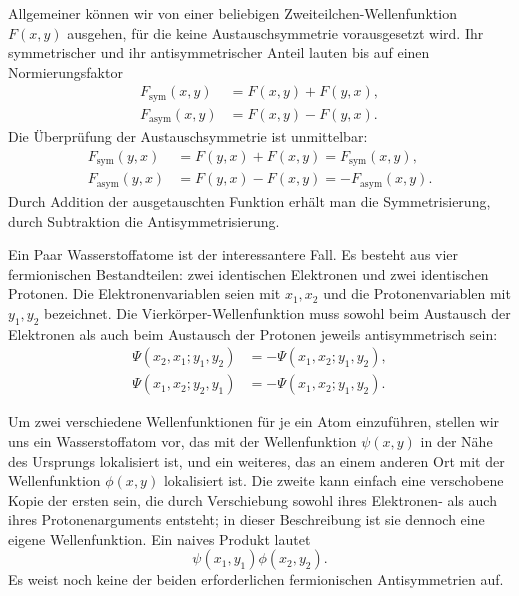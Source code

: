 Allgemeiner können wir von einer beliebigen Zweiteilchen-Wellenfunktion \(F(x,y)\) ausgehen, für die keine Austauschsymmetrie vorausgesetzt wird. Ihr symmetrischer und ihr antisymmetrischer Anteil lauten bis auf einen Normierungsfaktor
\begin{align}
F_{\mathrm{sym}}(x,y)&=F(x,y)+F(y,x),\\
F_{\mathrm{asym}}(x,y)&=F(x,y)-F(y,x).
\end{align}
Die Überprüfung der Austauschsymmetrie ist unmittelbar:
\begin{align}
F_{\mathrm{sym}}(y,x)
&=F(y,x)+F(x,y)
=F_{\mathrm{sym}}(x,y),\\
F_{\mathrm{asym}}(y,x)
&=F(y,x)-F(x,y)
=-F_{\mathrm{asym}}(x,y).
\end{align}
Durch Addition der ausgetauschten Funktion erhält man die Symmetrisierung, durch Subtraktion die Antisymmetrisierung.

Ein Paar Wasserstoffatome ist der interessantere Fall. Es besteht aus vier fermionischen Bestandteilen: zwei identischen Elektronen und zwei identischen Protonen. Die Elektronenvariablen seien mit \(x_1,x_2\) und die Protonenvariablen mit \(y_1,y_2\) bezeichnet. Die Vierkörper-Wellenfunktion muss sowohl beim Austausch der Elektronen als auch beim Austausch der Protonen jeweils antisymmetrisch sein:
\begin{align}
\Psi(x_2,x_1;y_1,y_2)
&=-\Psi(x_1,x_2;y_1,y_2),\\
\Psi(x_1,x_2;y_2,y_1)
&=-\Psi(x_1,x_2;y_1,y_2).
\end{align}

Um zwei verschiedene Wellenfunktionen für je ein Atom einzuführen, stellen wir uns ein Wasserstoffatom vor, das mit der Wellenfunktion \(\psi(x,y)\) in der Nähe des Ursprungs lokalisiert ist, und ein weiteres, das an einem anderen Ort mit der Wellenfunktion \(\phi(x,y)\) lokalisiert ist. Die zweite kann einfach eine verschobene Kopie der ersten sein, die durch Verschiebung sowohl ihres Elektronen- als auch ihres Protonenarguments entsteht; in dieser Beschreibung ist sie dennoch eine eigene Wellenfunktion. Ein naives Produkt lautet
\begin{equation}
\psi(x_1,y_1)\phi(x_2,y_2).
\end{equation}
Es weist noch keine der beiden erforderlichen fermionischen Antisymmetrien auf.

